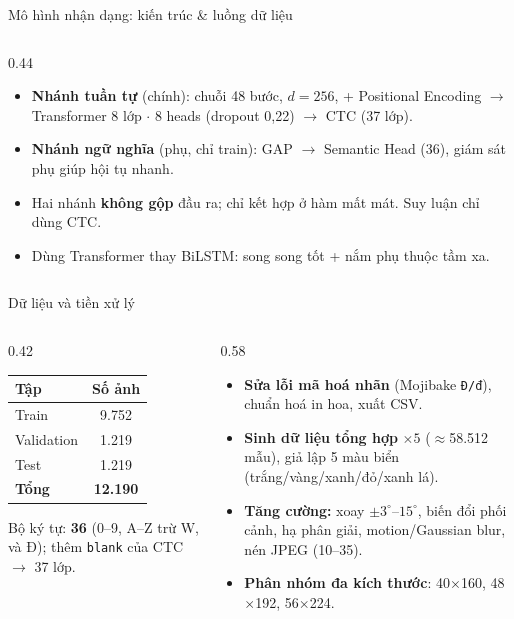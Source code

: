 \documentclass[aspectratio=169,9pt]{beamer}
\begin{document}
\begin{frame}{Mô hình nhận dạng: kiến trúc \& luồng dữ liệu}
\begin{columns}[T]
\begin{column}{0.44\textwidth}
\begin{itemize}
  \item \textbf{Nhánh tuần tự} (chính): chuỗi 48 bước, $d=256$, + Positional Encoding $\to$ Transformer 8 lớp $\cdot$ 8 heads (dropout 0,22) $\to$ CTC (37 lớp).
  \item \textbf{Nhánh ngữ nghĩa} (phụ, chỉ train): GAP $\to$ Semantic Head (36), giám sát phụ giúp hội tụ nhanh.
  \item Hai nhánh \textbf{không gộp} đầu ra; chỉ kết hợp ở hàm mất mát. Suy luận chỉ dùng CTC.
  \item Dùng Transformer thay BiLSTM: song song tốt + nắm phụ thuộc tầm xa.
\end{itemize}
\end{column}
\end{columns}
\end{frame}

\begin{frame}{Dữ liệu và tiền xử lý}
\begin{columns}[T]
\begin{column}{0.42\textwidth}
\begin{table}\centering\footnotesize
\begin{tabular}{lc}
\toprule
\textbf{Tập} & \textbf{Số ảnh} \\
\midrule
Train & 9.752 \\
Validation & 1.219 \\
Test & 1.219 \\
\midrule
\textbf{Tổng} & \textbf{12.190} \\
\bottomrule
\end{tabular}
\end{table}
{\footnotesize Bộ ký tự: \textbf{36} (0--9, A--Z trừ W, và Đ); thêm \texttt{blank} của CTC \(\to\) 37 lớp.}
\end{column}
\begin{column}{0.58\textwidth}
\begin{itemize}\footnotesize
  \item \textbf{Sửa lỗi mã hoá nhãn} (Mojibake \texttt{Đ/đ}), chuẩn hoá in hoa, xuất CSV.
  \item \textbf{Sinh dữ liệu tổng hợp} \(\times5\) (\(\approx\)58.512 mẫu), giả lập 5 màu biển (trắng/vàng/xanh/đỏ/xanh lá).
  \item \textbf{Tăng cường:} xoay \(\pm3^\circ\)--\(15^\circ\), biến đổi phối cảnh, hạ phân giải, motion/Gaussian blur, nén JPEG (10--35).
  \item \textbf{Phân nhóm đa kích thước}: 40$\times$160, 48$\times$192, 56$\times$224.
\end{itemize}
\end{column}
\end{columns}
\end{frame}
\end{document}
